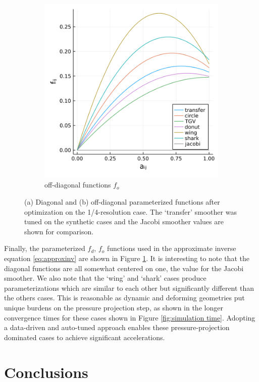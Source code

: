 \documentclass[review]{elsarticle}
\begin{document}
\begin{figure}
\begin{subfigure}[b]{0.47\textwidth}
        \includegraphics[width=\textwidth]{figures/lower_fun.png}
        \caption{off-diagonal functions $f_o$}
    \end{subfigure}
        \caption{(a) Diagonal and (b) off-diagonal parameterized functions after optimization on the 1/4-resolution case. The `transfer' smoother was tuned on the synthetic cases and the Jacobi smoother values are shown for comparison.}
        \label{fig:tuned inverse}
\end{figure}

Finally, the parameterized $f_d,\,f_o$ functions used in the approximate inverse equation \ref{eq:approxinv} are shown in Figure \ref{fig:tuned inverse}. It is interesting to note that the diagonal functions are all somewhat centered on one, the value for the Jacobi smoother. We also note that the `wing' and `shark' cases produce parameterizations which are similar to each other but significantly different than the others cases. This is reasonable as dynamic and deforming geometries put unique burdens on the pressure projection step, as shown in the longer convergence times for these cases shown in Figure \ref{fig:simulation time}. Adopting a data-driven and auto-tuned approach enables these pressure-projection dominated cases to achieve significant accelerations.

\section{Conclusions}
\end{document}
